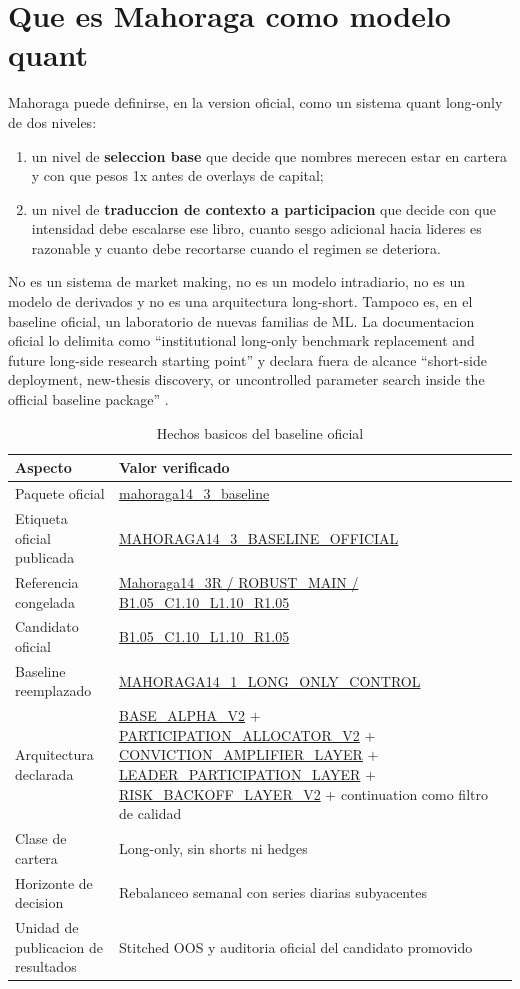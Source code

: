 \documentclass[11pt,letterpaper]{article}
\newcommand{\code}[1]{{\urlstyle{tt}\url{#1}}}
\newcommand{\baselinepkg}{\code{mahoraga14_3_baseline}}
\newcommand{\officiallabel}{\code{MAHORAGA14_3_BASELINE_OFFICIAL}}
\newcommand{\officialcandidate}{\code{B1.05_C1.10_L1.10_R1.05}}
\newcommand{\historicalcontrol}{\code{MAHORAGA14_1_LONG_ONLY_CONTROL}}
\newcommand{\basealpha}{\code{BASE_ALPHA_V2}}
\newcommand{\allocator}{\code{PARTICIPATION_ALLOCATOR_V2}}
\newcommand{\conviction}{\code{CONVICTION_AMPLIFIER_LAYER}}
\newcommand{\leaderlayer}{\code{LEADER_PARTICIPATION_LAYER}}
\newcommand{\backoff}{\code{RISK_BACKOFF_LAYER_V2}}
\begin{document}
\section{Que es Mahoraga como modelo quant}
Mahoraga puede definirse, en la version oficial, como un sistema quant long-only de dos niveles:

\begin{enumerate}
    \item un nivel de \textbf{seleccion base} que decide que nombres merecen estar en cartera y con que pesos 1x antes de overlays de capital;
    \item un nivel de \textbf{traduccion de contexto a participacion} que decide con que intensidad debe escalarse ese libro, cuanto sesgo adicional hacia lideres es razonable y cuanto debe recortarse cuando el regimen se deteriora.
\end{enumerate}

No es un sistema de market making, no es un modelo intradiario, no es un modelo de derivados y no es una arquitectura long-short. Tampoco es, en el baseline oficial, un laboratorio de nuevas familias de ML. La documentacion oficial lo delimita como \enquote{institutional long-only benchmark replacement and future long-side research starting point} y declara fuera de alcance \enquote{short-side deployment, new-thesis discovery, or uncontrolled parameter search inside the official baseline package} \citep{quantBaselineDocs2026}.

\begin{table}[H]
\centering
\caption{Hechos basicos del baseline oficial}
\label{tab:baseline-facts}
\begin{tabularx}{\textwidth}{>{\raggedright\arraybackslash}p{}X}
\toprule
\textbf{Aspecto} & \textbf{Valor verificado} \\
\midrule
Paquete oficial & \baselinepkg \\
Etiqueta oficial publicada & \officiallabel \\
Referencia congelada & \code{Mahoraga14_3R / ROBUST_MAIN / B1.05_C1.10_L1.10_R1.05} \\
Candidato oficial & \officialcandidate \\
Baseline reemplazado & \historicalcontrol \\
Arquitectura declarada & \basealpha{} $+$ \allocator{} $+$ \conviction{} $+$ \leaderlayer{} $+$ \backoff{} $+$ continuation como filtro de calidad \\
Clase de cartera & Long-only, sin shorts ni hedges \\
Horizonte de decision & Rebalanceo semanal con series diarias subyacentes \\
Unidad de publicacion de resultados & Stitched OOS y auditoria oficial del candidato promovido \\
\bottomrule
\end{tabularx}
\end{table}
\end{document}

